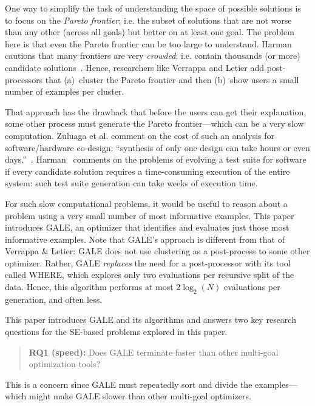\documentclass[10pt,journal,compsoc]{IEEEtran}
\newcommand{\fig}[1]{Figure~\ref{fig:#1}}
\newcommand{\ADD}[1]{#1}
\begin{document}

\ADD{One way to simplify the task of understanding the space of possible solutions is to focus on the {\em Pareto frontier}}; i.e. the subset of solutions that are not worse than any other (across all goals) but better on at least one goal. 
The problem here is that even the Pareto frontier can be too large to understand.
Harman cautions that many frontiers are very {\em crowded}; i.e. contain thousands (or more)  candidate solutions~\cite{harm13}.
Hence, researchers like Verrappa and Letier add post-processors that (a)~cluster the Pareto frontier and then (b)~show users a small number of examples per cluster. 

That approach has the drawback that before the users can get their explanation, some other process must generate the Pareto frontier---which can be a very slow computation.  
Zuluaga et al. comment on the cost of such an analysis for software/hardware co-design: ``synthesis of only one design can take hours or even days.''~\cite{Zuluaga:13}.  
Harman~\cite{harm13} comments on the problems of evolving a test suite for software if every candidate solution requires a time-consuming execution of the entire system: such test suite generation can take weeks of execution time. 

For such slow computational problems, it would be useful to reason about a problem using a very small number of most informative examples. 
This paper introduces GALE, an optimizer that  identifies and evaluates just those most informative examples.
Note that GALE's approach is different from that of Verrappa \& Letier: GALE does not use clustering as a post-process to some other optimizer.
Rather, GALE {\em replaces} the need for a post-processor with its tool called WHERE, which explores only two evaluations per recursive split of the data. 
Hence, this algorithm performs at most $2{\log_2}(N)$ evaluations per generation, and often less.

This paper introduces GALE and its algorithms and answers two key research questions for the SE-based problems explored in this paper.
\begin{quote}
{\bf RQ1 (speed):} Does GALE terminate faster than other multi-goal optimization tools?
\end{quote}
This is a concern since GALE must  repeatedly sort and divide  the examples---which might  make  GALE  slower than other multi-goal optimizers.
\end{document}
